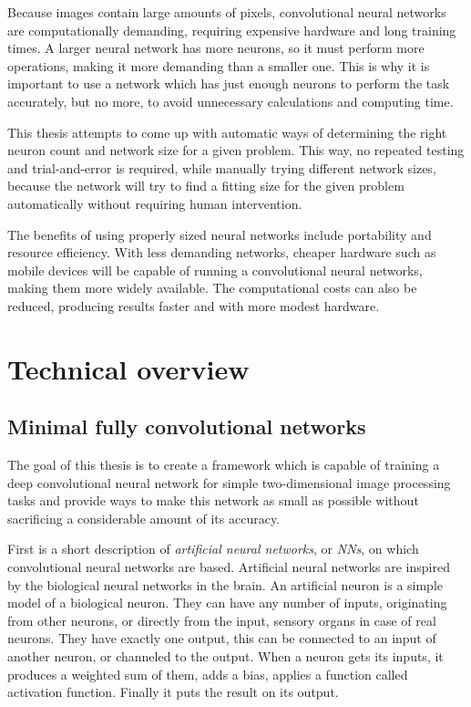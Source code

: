 \documentclass[12pt]{report}
\begin{document}
Because images contain large amounts of pixels, convolutional neural networks are computationally demanding, requiring expensive hardware and long training times. A larger neural network has more neurons, so it must perform more operations, making it more demanding than a smaller one. This is why it is important to use a network which has just enough neurons to perform the task accurately, but no more, to avoid unnecessary calculations and computing time.\par

This thesis attempts to come up with automatic ways of determining the right neuron count and network size for a given problem. This way, no repeated testing and trial-and-error is required, while manually trying different network sizes, because the network will try to find a fitting size for the given problem automatically without requiring human intervention.\par

The benefits of using properly sized neural networks include portability and resource efficiency. With less demanding networks, cheaper hardware such as mobile devices will be capable of running a convolutional neural networks, making them more widely available. The computational costs can also be reduced, producing results faster and with more modest hardware.
\chapter{Technical overview}
\section{Minimal fully convolutional networks}
The goal of this thesis is to create a framework which is capable of training a deep convolutional neural network for simple two-dimensional image processing tasks and provide ways to make this network as small as possible without sacrificing a considerable amount of its accuracy.\par

First is a short description of\textit{ artificial neural networks}, or \textit{NNs}, on which convolutional neural networks are based. Artificial neural networks are inspired by the biological neural networks in the brain. An artificial neuron is a simple model of a biological neuron. They can have any number of inputs, originating from other neurons, or directly from the input, sensory organs in case of real neurons. They have exactly one output, this can be connected to an input of another neuron, or channeled to the output. When a neuron gets its inputs, it produces a weighted sum of them, adds a bias, applies a function called activation function. Finally it puts the result on its output.\par
\end{document}

